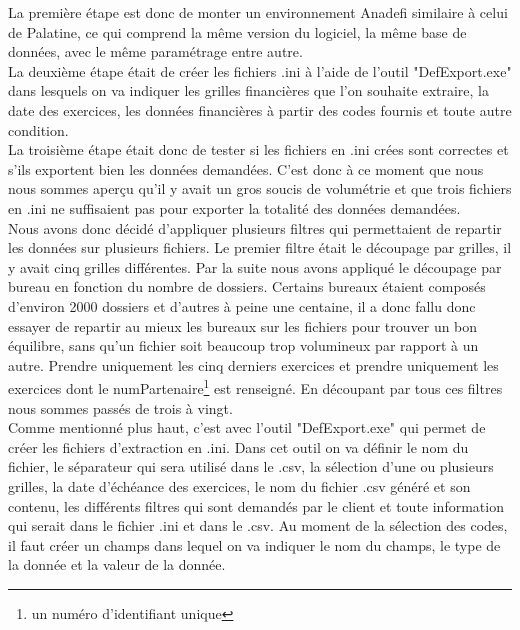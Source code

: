 La première étape est donc de monter un environnement Anadefi similaire à celui de Palatine, ce qui comprend la même version du logiciel, la même base de données, avec le même paramétrage entre autre.\\

La deuxième étape était de créer les fichiers .ini à l'aide de l'outil "DefExport.exe" dans lesquels on va indiquer les grilles financières que l'on souhaite extraire, la date des exercices, les données financières à partir des codes fournis et toute autre condition.\\

La troisième étape était donc de tester si les fichiers en .ini crées sont correctes et s'ils exportent bien les données demandées. C'est donc à ce moment que nous nous sommes aperçu qu'il y avait un gros soucis de volumétrie et que trois fichiers en .ini ne suffisaient pas pour exporter la totalité des données demandées.\\

Nous avons donc décidé d'appliquer plusieurs filtres qui permettaient de repartir les données sur plusieurs fichiers. Le premier filtre était le découpage par grilles, il y avait cinq grilles différentes. Par la suite nous avons appliqué le découpage par bureau en fonction du nombre de dossiers. Certains bureaux étaient composés d'environ 2000 dossiers et d'autres à peine une centaine, il a donc fallu donc essayer de repartir au mieux les bureaux sur les fichiers pour trouver un bon équilibre, sans qu'un fichier soit beaucoup trop volumineux par rapport à un autre. Prendre uniquement les cinq derniers exercices et prendre uniquement les exercices dont le numPartenaire\footnote{un numéro d'identifiant unique} est renseigné. En découpant par tous ces filtres nous sommes passés de trois à vingt.\\

Comme mentionné plus haut, c'est avec l'outil "DefExport.exe" qui permet de créer les fichiers d'extraction en .ini.
Dans cet outil on va définir le nom du fichier, le séparateur qui sera utilisé dans le .csv, la sélection d'une ou plusieurs grilles, la date d'échéance des exercices, le nom du fichier .csv généré et son contenu, les différents filtres qui sont demandés par le client et toute information qui serait dans le fichier .ini et dans le .csv. Au moment de la sélection des codes, il faut créer un champs dans lequel on va indiquer le nom du champs, le type de la donnée et la valeur de la donnée.

